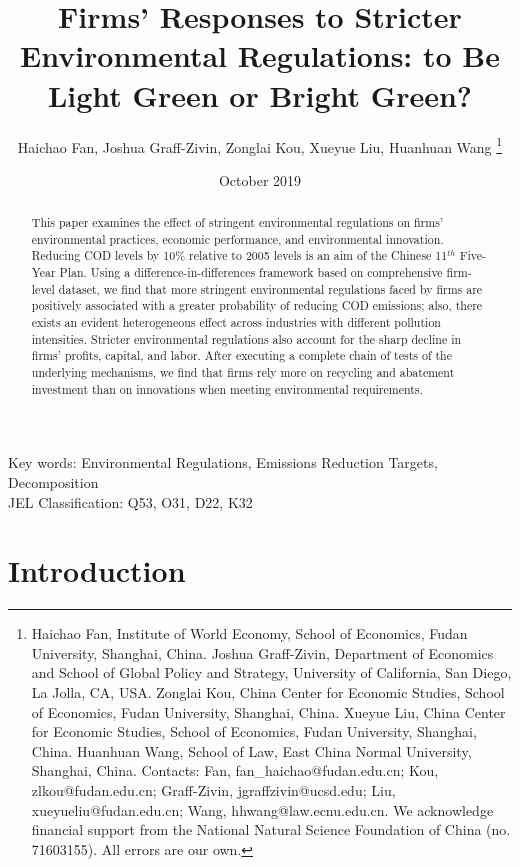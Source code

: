 \documentclass[12pt,english]{article}
\begin{document}
\title{Firms' Responses to Stricter Environmental Regulations: to Be Light Green or Bright Green?}

\author{Haichao Fan, Joshua Graff-Zivin, Zonglai Kou, Xueyue Liu, Huanhuan Wang \footnote{Haichao Fan, Institute of World Economy, School of Economics, Fudan University, Shanghai, China. Joshua Graff-Zivin, Department of Economics and School of Global Policy and Strategy, University of California, San Diego, La Jolla, CA, USA. Zonglai Kou, China Center for Economic Studies, School of Economics, Fudan University, Shanghai, China. Xueyue Liu, China Center for Economic Studies, School of Economics, Fudan University, Shanghai, China. Huanhuan Wang, School of Law, East China Normal University, Shanghai, China. Contacts: Fan, fan\_haichao@fudan.edu.cn; Kou, zlkou@fudan.edu.cn; Graff-Zivin, jgraffzivin@ucsd.edu; Liu, xueyueliu@fudan.edu.cn; Wang, hhwang@law.ecnu.edu.cn. We acknowledge financial support from the National Natural Science Foundation of China (no. 71603155). All errors are our own.}}
\date{October 2019}
\maketitle
\begin{abstract}

This paper examines the effect of stringent environmental regulations on firms' environmental practices, economic performance, and environmental innovation. Reducing COD levels by 10\% relative to 2005 levels is an aim of the Chinese 11$^{th}$ Five-Year Plan. Using a difference-in-differences framework based on comprehensive firm-level dataset, we find that more stringent environmental regulations faced by firms are positively associated with a greater probability of reducing COD emissions; also, there exists an evident heterogeneous effect across industries with different pollution intensities. Stricter environmental regulations also account for the sharp decline in firms' profits, capital, and labor. After executing a complete chain of tests of the underlying mechanisms, we find that firms rely more on recycling and abatement investment than on innovations when meeting environmental requirements.

\end{abstract}
Key words: Environmental Regulations, Emissions Reduction Targets, Decomposition\\
JEL Classification: Q53, O31, D22, K32
\newpage
\onehalfspacing
\section{Introduction}
\end{document}
